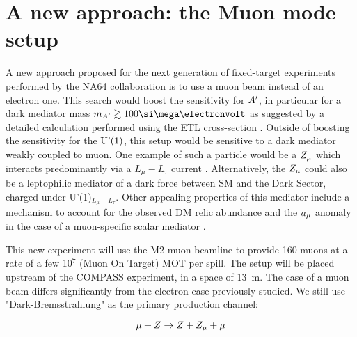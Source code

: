 \FloatBarrier\noindent
\section{A new approach: the Muon mode setup}
\label{ch5:sec:muon-mode-setup}

A new approach proposed for the next generation of fixed-target experiments performed by the NA64 collaboration is to use a muon beam instead of an electron one. This search would boost the sensitivity for $A'$, in particular for a dark mediator mass $m_{\DM} \gtrsim 100 \mev$ as suggested by a detailed calculation performed using the ETL cross-section \cite{Gninenko:2019qiv}. Outside of boosting the sensitivity for the $\textrm{U'(1)}$, this setup would be sensitive to a dark mediator weakly coupled to muon. One example of such a particle would be a $Z_{\mu}$ which interacts predominantly via a $L_{\mu} - L_{\tau}$ current \cite{krasnikov2017muon,GNINENKO2001119}. Alternatively, the $Z_{\mu}$ could also be a leptophilic mediator of a dark force between SM and the Dark Sector, charged under U'(1)$_{L_{\mu} - L_{\tau}}$. Other appealing properties of this mediator include a mechanism to account for the observed DM relic abundance \cite{GNINENKO2001119,Kirpichnikov:2020tcf,PhysRevLett.121.011102} and the $a_{\mu}$ anomaly in the case of a muon-specific scalar mediator \cite{krasnikov2017light,PhysRevD.95.115005}.

This new experiment will use the M2 muon beamline to provide 160 \gev muons at a rate of a few 10$^7$ (Muon On Target) MOT per spill. The setup will be placed upstream of the COMPASS experiment, in a space of \SI{13}{\meter}. The case of a muon beam differs significantly from the electron case previously studied. We still use "Dark-Bremsstrahlung" as the primary production channel:

\begin{equation}
  \label{eq:dm-muon-int}
  \mu + Z \to Z + Z_{\mu} + \mu
\end{equation}

